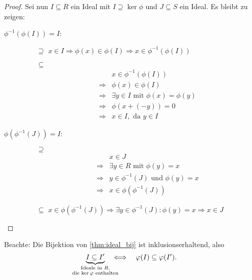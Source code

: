 \documentclass[12pt,a4paper]{scrartcl}
\begin{document}
\begin{proof}
	Sei nun $I \subseteq R$ ein Ideal mit $I \supseteq \ker\phi$ und $J \subseteq S$ ein Ideal. Es bleibt zu zeigen:
	\begin{description}
		\item[$\phi^{-1}(\phi(I)) = I$:] \leavevmode
		\begin{itemize}
			\item[\glqq $\supseteq$\grqq] $x\in I \Rightarrow \phi(x) \in \phi(I)\Rightarrow x\in \phi^{-1}(\phi(I))$
			\item[\glqq $\subseteq$\grqq] 
			\begin{align*}
				&x\in \phi^{-1}(\phi(I)) \\
				\Rightarrow & \phi(x)\in \phi(I) \\
				\Rightarrow & \exists y\in I \text{ mit } \phi(x) = \phi(y) \\
				\Rightarrow & \phi(x+(-y)) = 0 \\
				\Rightarrow & x\in I, \text{ da } y \in I
			\end{align*}
		\end{itemize}
		\item[$\phi(\phi^{-1}(J)) = I$:] \leavevmode
		\begin{itemize}
			\item[\glqq $\supseteq$\grqq] 
			\begin{align*}
				&x\in J \\
				\Rightarrow &\exists y\in R \text{ mit } \phi(y) = x \\
				\Rightarrow &y\in\phi^{-1}(J) \text{ und } \phi(y) = x \\
				\Rightarrow &x\in\phi(\phi^{-1}(J))
			\end{align*}
			\item[\glqq$\subseteq$\grqq] $x\in\phi(\phi^{-1}(J))\Rightarrow \exists y\in\phi^{-1}(J)\colon \phi(y) = x\Rightarrow x\in J$
		\end{itemize}
	\end{description}
\end{proof}

\begin{bem} Beachte: Die Bijektion von \cref{thm:ideal_bij} ist inklusionserhaltend, also 
	\[
	\underbrace{I \subseteq I'}_{\mathclap{\substack{\text{Ideale in $R$,}\\\text{die $\ker\phi$ enthalten}}}} \quad \Longleftrightarrow \quad \phi(I) \subseteq \phi(I').
	\]
\end{bem}
\end{document}
